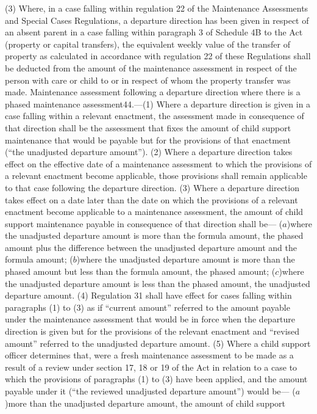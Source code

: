 \documentclass[a4paper]{article}
\begin{document}
(3) Where, in a case falling within regulation 22 of the Maintenance Assessments
and Special Cases Regulations, a departure direction has been given in respect
of an absent parent in a case falling within paragraph 3 of Schedule 4B to the
Act (property or capital transfers), the equivalent weekly value of the transfer
of property as calculated in accordance with regulation 22 of these Regulations
shall be deducted from the amount of the maintenance assessment in respect of
the person with care or child to or in respect of whom the property transfer was
made.
Maintenance assessment following a departure direction where there is a phased
maintenance assessment44.—(1) Where a departure direction is given in a case
falling within a relevant enactment, the assessment made in consequence of that
direction shall be the assessment that fixes the amount of child support
maintenance that would be payable but for the provisions of that enactment (“the
unadjusted departure amount”).
(2) Where a departure direction takes effect on the effective date of a
maintenance assessment to which the provisions of a relevant enactment become
applicable, those provisions shall remain applicable to that case following the
departure direction.
(3) Where a departure direction takes effect on a date later than the date on
which the provisions of a relevant enactment become applicable to a maintenance
assessment, the amount of child support maintenance payable in consequence of
that direction shall be—
($a$)where the unadjusted departure amount is more than the formula amount, the
phased amount plus the difference between the unadjusted departure amount and
the formula amount;
($b$)where the unadjusted departure amount is more than the phased amount but less
than the formula amount, the phased amount;
($c$)where the unadjusted departure amount is less than the phased amount, the
unadjusted departure amount.
(4) Regulation 31 shall have effect for cases falling within paragraphs (1) to
(3) as if “current amount” referred to the amount payable under the maintenance
assessment that would be in force when the departure direction is given but for
the provisions of the relevant enactment and “revised amount” referred to the
unadjusted departure amount.
(5) Where a child support officer determines that, were a fresh maintenance
assessment to be made as a result of a review under section 17, 18 or 19 of the
Act in relation to a case to which the provisions of paragraphs (1) to (3) have
been applied, and the amount payable under it (“the reviewed unadjusted
departure amount”) would be—
($a$)more than the unadjusted departure amount, the amount of child support
\end{document}
